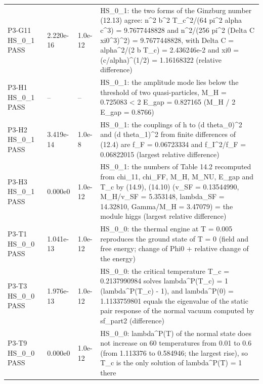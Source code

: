 \documentclass[aps,prd,onecolumn,superscriptaddress,nofootinbib,floatfix,longbibliography]{revtex4-2}
\begin{document}
\begin{longtable}{p{}p{}p{}p{}}
P3-G11 HS\_0\_1 \newline PASS & 2.220e-16 & 1.0e-12 & HS\_0\_1: the two forms of the Ginzburg number (12.13) agree: n\textasciicircum{}2 b\textasciicircum{}2 T\_c\textasciicircum{}2/(64 pi\textasciicircum{}2 alpha c\textasciicircum{}3) = 9.7677448828 and n\textasciicircum{}2/(256 pi\textasciicircum{}2 (Delta C xi0\textasciicircum{}3)\textasciicircum{}2) = 9.7677448828, with Delta C = alpha\textasciicircum{}2/(2 b T\_c) = 2.436246e-2 and xi0 = (c/alpha)\textasciicircum{}(1/2) = 1.16168322 (relative difference) \\
P3-H1 HS\_0\_1 \newline PASS & -- & -- & HS\_0\_1: the amplitude mode lies below the threshold of two quasi-particles, M\_H = 0.725083 \textless{} 2 E\_gap = 0.827165 (M\_H / 2 E\_gap = 0.8766) \\
P3-H2 HS\_0\_1 \newline PASS & 3.419e-14 & 1.0e-8 & HS\_0\_1: the couplings of h to (d theta\_0)\textasciicircum{}2 and (d theta\_1)\textasciicircum{}2 from finite differences of (12.4) are f\_F = 0.06723334 and f\_I\textasciicircum{}2/f\_F = 0.06822015 (largest relative difference) \\
P3-H3 HS\_0\_1 \newline PASS & 0.000e0 & 1.0e-12 & HS\_0\_1: the numbers of Table 14.2 recomputed from chi\_11, chi\_FF, M\_H, M\_NU, E\_gap and T\_c by (14.9), (14.10) (v\_SF = 0.13544990, M\_H/v\_SF = 5.353148, lambda\_SF = 14.32810, Gamma/M\_H = 3.47079) = the module higgs (largest relative difference) \\
P3-T1 HS\_0\_0 \newline PASS & 1.041e-13 & 1.0e-12 & HS\_0\_0: the thermal engine at T = 0.005 reproduces the ground state of T = 0 (field and free energy; \textbar{}change of Phi0\textbar{} + relative change of the energy) \\
P3-T3 HS\_0\_0 \newline PASS & 1.976e-13 & 1.0e-12 & HS\_0\_0: the critical temperature T\_c = 0.2137990984 solves lambda\textasciicircum{}P(T\_c) = 1 (\textbar{}lambda\textasciicircum{}P(T\_c) - 1\textbar{}), and lambda\textasciicircum{}P(0) = 1.1133759801 equals the eigenvalue of the static pair response of the normal vacuum computed by sf\_part2 (difference) \\
P3-T9 HS\_0\_0 \newline PASS & 0.000e0 & 1.0e-12 & HS\_0\_0: lambda\textasciicircum{}P(T) of the normal state does not increase on 60 temperatures from 0.01 to 0.6 (from 1.113376 to 0.584946; the largest rise), so T\_c is the only solution of lambda\textasciicircum{}P(T) = 1 there \\

\end{longtable}
\end{document}
